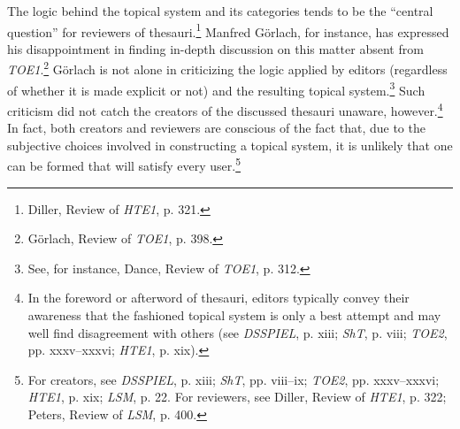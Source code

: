 The logic behind the topical system and its categories tends to be the ``central question'' for reviewers of thesauri.\footnote{Diller, Review of \textit{HTE1}, %
p. 321.} Manfred Görlach, for instance, has expressed his disappointment in finding in-depth discussion on this matter absent from \textit{TOE1}.\footnote{Görlach, Review of \textit{TOE1}, %
p. 398.} Görlach is not alone in criticizing the logic applied by editors (regardless of whether it is made explicit or not) and the resulting topical system.\footnote{See, for instance, Dance, Review of \textit{TOE1}, p. 312.} Such criticism did not catch the creators of the discussed thesauri unaware, however.\footnote{In the foreword or afterword of thesauri, editors typically convey their awareness that the fashioned topical system is only a best attempt and may well find disagreement with others (see \textit{DSSPIEL}, p. xiii; \textit{ShT}, p. viii; \textit{TOE2}, pp. xxxv–xxxvi; \textit{HTE1}, p. xix).} In fact, both creators and reviewers are conscious of the fact that, due to the subjective choices involved in constructing a topical system, it is unlikely that one can be formed that will satisfy every user.\footnote{For creators, see \textit{DSSPIEL}, p. xiii; \textit{ShT}, pp. viii–ix; \textit{TOE2}, pp. xxxv–xxxvi; \textit{HTE1}, p. xix; \textit{LSM}, p. 22.
For reviewers, see Diller, Review of \textit{HTE1}, p. 322; Peters, Review of \textit{LSM}, %
p. 400.} 

